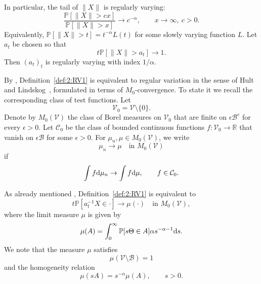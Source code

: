 \documentclass[preprint,12pt]{elsarticle}
\theoremstyle{definition}
\theoremstyle{remark}
\newcommand{\Xbf}{{ X}}
\newcommand{\1}{{\mathbf 1}}
\numberwithin{equation}{section}
\newcommand{\Pbb}{\mathbb{P}}
\newcommand{\ud}{{\rm d}}
\newcommand{\Vcal}{\mathcal{V}}
\newcommand{\Bcal}{\mathcal{B}}
\newcommand{\Ccal}{\mathcal{C}}
\begin{document}
  In particular, the tail of $\|\Xbf\|$ is regularly varying:
  \begin{equation}\label{urv}
    \frac{\Pbb[\|\Xbf\|>cx]}{\Pbb[\|\Xbf\|>x]} \to c^{-\alpha},
    \qquad x\to\infty,\ c>0.
  \end{equation}
  Equivalently, $\Pbb[\|\Xbf\|>t]=t^{-\alpha}L(t)$ for some slowly varying function $L$. Let $a_t$ be chosen so that
  \begin{equation}\label{eq:2:at}
    t\Pbb[\|\Xbf\|>a_t] \to 1 .
  \end{equation}
  Then $(a_t)_t$ is regularly varying with index $1/\alpha$.

  By \cite[Proposition~3.1]{segers2017polar}, Definition~\ref{def:2:RV1} is equivalent to regular variation in the 
  sense of Hult and Lindskog~\cite{hult2006regular}, formulated in terms of $M_0$-convergence. 
  To state it we recall the corresponding class of test functions. Let
  \begin{equation*}
    \Vcal_0=\Vcal\setminus \{0\}.
  \end{equation*}
  Denote by $M_0(\Vcal)$ the class of Borel measures on $\Vcal_0$ that are finite on $\epsilon\Bcal^c$ 
  for every $\epsilon>0$. Let $\Ccal_0$ be the class of bounded continuous 
  functions $f\colon \Vcal_0\to\mathbb{R}$ that vanish on $\epsilon\Bcal$ for some $\epsilon>0$. 
  For $\mu_n,\mu\in M_0(\Vcal)$, we write
  \begin{equation*}
    \mu_n\to\mu \quad\text{in }M_0(\Vcal)
  \end{equation*}
  if
  \begin{equation*}
    \int f \ud\mu_n\to\int f \ud\mu,
    \qquad f\in\Ccal_0.
  \end{equation*}

  As already mentioned \cite[Proposition~3.1]{segers2017polar}, Definition~\ref{def:2:RV1} is equivalent to
  \begin{equation*}
    t\Pbb[a_t^{-1}\Xbf\in\cdot]\to \mu(\cdot)
    \quad\text{in }M_0(\Vcal),
  \end{equation*}
  where the limit measure $\mu$ is given by
  \begin{equation}\label{eq:2:muTheta}
    \mu(A)=\int_0^\infty \Pbb[s\Theta\in A]\alpha s^{-\alpha-1}\ud s .
  \end{equation}
  We note that the measure $\mu$ satisfies
  \begin{equation}\label{eq:2:norm}
    \mu(\Vcal\setminus\Bcal)=1
  \end{equation}
  and the homogeneity relation
  \begin{equation}\label{eq:2:hom}
    \mu(sA)=s^{-\alpha}\mu(A),
    \qquad s>0.
  \end{equation}
\end{document}
